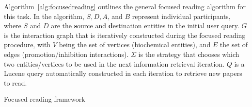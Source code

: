 Algorithm~\ref{alg:focusedreading} outlines the general focused reading algorithm for this task.  
In the algorithm, $S, D, A$, and $B$ represent individual participants, where $S$ and $D$ are the {\bf s}ource and {\bf d}estination entities in the initial user query. $G$ is the interaction graph that is iteratively constructed during the focused reading procedure, with $V$ being the set of vertices (biochemical entities), and $E$ the set of edges (promotion/inhibition interactions). 
$\mathit{\Sigma}$ is the strategy that chooses which two entities/vertices to be used in the next information retrieval iteration.
$Q$ is a Lucene query automatically constructed in each iteration to retrieve new papers to read.


\begin{algorithm}
\caption{Focused reading framework}
\begin{algorithmic}[1]
{\small
{}%
    \label{alg:fr:graph}%
   \Repeat \label{alg:fr:start}
   		 \label{alg:endpointsstrategy}
		 \label{alg:chendpoints}
   		 \label{alg:chquery}
   		 \label{alg:ie}%
   		 \label{alg:reconcile}%
   \label{alg:fr:stop}
\EndProcedure
}
\end{algorithmic}
\label{alg:focusedreading}
\end{algorithm}


